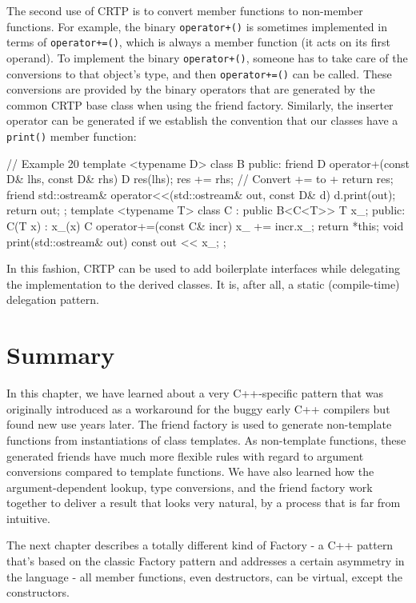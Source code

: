 The second use of CRTP is to convert member functions to non-member functions. For example, the binary \texttt{operator+()} is sometimes implemented in terms of \texttt{operator+=()}, which is always a member function (it acts on its first operand). To implement the binary \texttt{operator+()}, someone has to take care of the conversions to that object's type, and then \texttt{operator+=()} can be called. These conversions are provided by the binary operators that are generated by the common CRTP base class when using the friend factory. Similarly, the inserter operator can be generated if we establish the convention that our classes have a \texttt{print()} member function:

\begin{code}
// Example 20
template <typename D> class B {
  public:
  friend D operator+(const D& lhs, const D& rhs) {
    D res(lhs);
    res += rhs; // Convert += to +
    return res;
  }
  friend std::ostream&
  operator<<(std::ostream& out, const D& d) {
    d.print(out);
    return out;
  }
};
template <typename T> class C : public B<C<T>> {
  T x_;
  public:
  C(T x) : x_(x) {}
  C operator+=(const C& incr) {
    x_ += incr.x_;
    return *this;
  }
  void print(std::ostream& out) const {
    out << x_;
  }
};
\end{code}

In this fashion, CRTP can be used to add boilerplate interfaces while delegating the implementation to the derived classes. It is, after all, a static (compile-time) delegation pattern.

\section{Summary}

In this chapter, we have learned about a very C++-specific pattern that was originally introduced as a workaround for the buggy early C++ compilers but found new use years later. The friend factory is used to generate non-template functions from instantiations of class templates. As non-template functions, these generated friends have much more flexible rules with regard to argument conversions compared to template functions. We have also learned how the argument-dependent lookup, type conversions, and the friend factory work together to deliver a result that looks very natural, by a process that is far from intuitive.

The next chapter describes a totally different kind of Factory - a C++ pattern that's based on the classic Factory pattern and addresses a certain asymmetry in the language - all member functions, even destructors, can be virtual, except the constructors.

